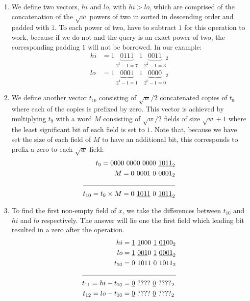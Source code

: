 \begin{enumerate}
    \item \label{blt:parallel1}
    We define two vectors, $hi$ and $lo$, with $hi > lo$, which are comprised of the concatenation of the $\sqrt{w}$ powers of two in sorted in descending order and padded with $1$. To each power of two, have to subtract $1$ for this operation to work, because if we do not and the query is an exact power of two, the corresponding padding $1$ will not be borrowed. In our example:
    \begin{align*}
        hi &= 1\ \underbrace{0111}_{2^3-1=7}\ 1\ \underbrace{0011}_{2^2-1=3}{}_2\\
        lo &= 1\ \underbrace{0001}_{2^1-1=1}\ 1\ \underbrace{0000}_{2^0-1=0}{}_2
    \end{align*}
    
    \item \label{blt:parallel2}
    We define another vector $t_{10}$ consisting of $\sqrt{w}/2$ concatenated copies of $t_9$ where each of the copies is prefixed by zero. This vector is achieved by multiplying $t_9$ with a word $M$ consisting of $\sqrt{w}/2$ fields of size $\sqrt{w} + 1$ where the least significant bit of each field is set to $1$. Note that, because we have set the size of each field of $M$ to have an additional bit, this corresponds to prefix a zero to each $\sqrt{w}$ field:
    \begin{align*}
        t_9 = 0000\ 0000\ 0000\ &\underline{1011}_2\\ 
        M = 0\ 0001\ 0\ &0001_2\\ \cline{1-2}
        t_{10} = t_9 \times M = 0\ \underline{1011}\ 0\ &\underline{1011}_2
    \end{align*}
    
    \item \label{blt:parallel3}
    To find the first non-empty field of $x$, we take the differences between $t_{10}$ and $hi$ and $lo$ respectively. The answer will lie one the first field which leading bit resulted in a zero after the operation.
    \begin{align*}
                          hi &= \underline{1}\ \underline{1}000\ \underline{1}\ \underline{01}00_2\\
                          lo &= \underline{1}\ \underline{001}0\ \underline{1}\ \underline{0001}_2 \\
                      t_{10} &= 0\ 1011\ 0\ 1011_2\\ \cline{1-2}
        t_{11} = hi - t_{10} &= \underline{0}\ ????\ \underline{0}\ ????_2 \\
        t_{12} = lo - t_{10} &= \underline{0}\ ????\ \underline{0}\ ????_2
    \end{align*}
    

\end{enumerate}
